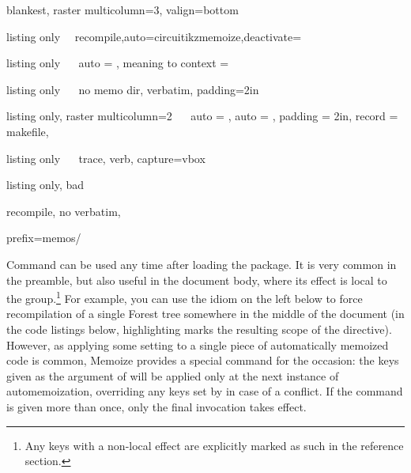 \documentclass[a4paper,11pt]{article}
\begin{document}
\begin{tcbraster}[raster columns=4, raster valign=bottom]
  \begin{tcboxedraster}[raster columns=1]{blankest, raster multicolumn=3, valign=bottom}
    \begin{tcblisting}{listing only}
~\mmzset~{recompile,auto={circuitikz}{memoize},deactivate=\tikz}
    \end{tcblisting}
    \begin{tcblisting}{listing only}
~\mmzset~{ auto = , meaning to context = \foo }
    \end{tcblisting}
  \end{tcboxedraster}
  \begin{tcblisting}{listing only}
~\mmzset~{
  no memo dir,
  verbatim,
  padding=2in}
  \end{tcblisting}
\end{tcbraster}\par
\begin{tcbraster}[raster columns=4, raster valign=top]
  \begin{tcblisting}{listing only, raster multicolumn=2}
~\mmzset~{
  auto    = ,
  auto    = ,
  padding = 2in,
  record  = makefile,
}
  \end{tcblisting}
  \begin{tcblisting}{listing only}
~\mmzset~{
  trace,
  verb,
  capture=vbox
}
  \end{tcblisting}
  \begin{tcblisting}{listing only, bad}
~\mmzset~{
  recompile,
  no verbatim,

  prefix=memos/
}
  \end{tcblisting}
\end{tcbraster}

Command  can be used any time after loading the package.  It is
very common in the preamble, but also useful in the document body, where its
effect is local to the  group.\footnote{Any keys with a non-local
  effect are explicitly marked as such in the reference section.} For example,
you can use the idiom on the left below to force recompilation of a single
Forest tree somewhere in the middle of the document (in the code listings
below, highlighting marks the resulting scope of the 
directive).  However, as applying some setting to a single piece of
automatically memoized code is common, Memoize provides a special command for
the occasion: the keys given as the argument of  will be
applied only at the next instance of automemoization, overriding any keys set
by  in case of a conflict.  If the command is given more than
once, only the final invocation takes effect.
\end{document}
